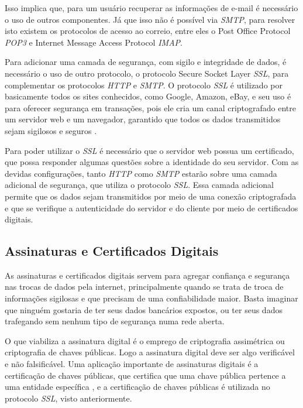 Isso implica que, para um usuário recuperar as informações de e-mail é necessário 
o uso de outros componentes. Já que isso não é possível via \textit{SMTP}, para 
resolver isto existem os protocolos de acesso ao correio, entre eles o 
Post Office Protocol \textit{POP3} e Internet Message Access Protocol \textit{IMAP}.

Para adicionar uma camada de segurança, com sigilo e integridade de dados, é necessário
o uso de outro protocolo, o protocolo Secure Socket Layer \textit{SSL}, para 
complementar os protocolos \textit{HTTP} e \textit{SMTP}. O protocolo \textit{SSL} 
é utilizado por basicamente todos os sites conhecidos, como Google,
Amazon, eBay, e seu uso é para oferecer segurança em transações, pois ele cria um
canal criptografado entre um servidor web e um navegador, garantido que todos os
dados transmitidos sejam sigilosos e seguros \cite{kurose2010redes}. 

Para poder utilizar o \textit{SSL} é necessário que o servidor web 
possua um certificado, que possa responder algumas questões sobre a 
identidade do seu servidor. Com as devidas configurações, tanto \textit{HTTP} como 
\textit{SMTP} estarão sobre uma camada adicional de segurança, que utiliza o 
protocolo \textit{SSL}. Essa camada adicional permite que os dados sejam 
transmitidos por meio de uma conexão criptografada e que se verifique a autenticidade
do servidor e do cliente por meio de certificados digitais. 

\subsection{Assinaturas e Certificados Digitais}

As assinaturas e certificados digitais servem para agregar confiança e segurança
nas trocas de dados pela internet, principalmente quando se trata de troca de informações
sigilosas e que precisam de uma confiabilidade maior. Basta imaginar que ninguém
gostaria de ter seus dados bancários expostos, ou ter seus dados trafegando sem
nenhum tipo de segurança numa rede aberta. 

O que viabiliza a assinatura digital é o emprego de criptografia assimétrica 
ou criptografia de chaves
públicas. Logo a assinatura digital deve ser algo verificável e não falsificável. Uma
aplicação importante de assinaturas digitais é a certificação de chaves públicas,
que certifica que uma chave pública pertence a uma entidade específica \cite{kurose2010redes},
e a certificação de chaves públicas é utilizada no protocolo \textit{SSL}, visto anteriormente.

